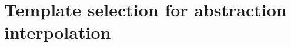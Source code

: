 

\section{Template selection for abstraction interpolation}\label{section:template-selection}






